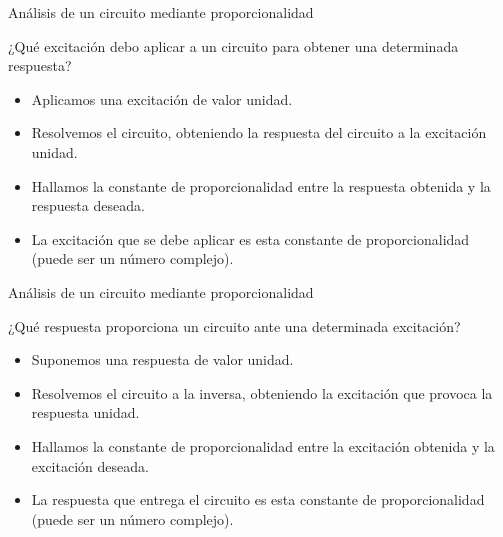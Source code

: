 \documentclass[xcolor={usenames,svgnames,dvipsnames}]{beamer}
\begin{document}
\begin{frame}[label={sec:orgb728506}]{Análisis de un circuito mediante proporcionalidad}
\begin{block}{¿Qué excitación debo aplicar a un circuito para obtener una determinada respuesta?}
\begin{itemize}
\item Aplicamos una excitación de valor unidad.
\item Resolvemos el circuito, obteniendo la respuesta del circuito a la excitación unidad.
\item Hallamos la constante de proporcionalidad entre la respuesta obtenida y la respuesta deseada.
\item La excitación que se debe aplicar es esta constante de proporcionalidad (puede ser un número complejo).
\end{itemize}
\end{block}
\end{frame}

\begin{frame}[label={sec:org80f2f10}]{Análisis de un circuito mediante proporcionalidad}
\begin{block}{¿Qué respuesta proporciona un circuito ante una determinada excitación?}
\begin{itemize}
\item Suponemos una respuesta de valor unidad.
\item Resolvemos el circuito a la inversa, obteniendo la excitación que provoca la respuesta unidad.
\item Hallamos la constante de proporcionalidad entre la excitación obtenida y la excitación deseada.
\item La respuesta que entrega el circuito es esta constante de proporcionalidad (puede ser un número complejo).
\end{itemize}
\end{block}
\end{frame}
\end{document}
